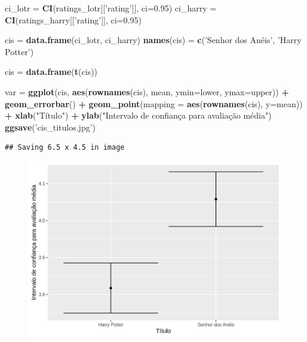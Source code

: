 \documentclass[]{article}
\newenvironment{Shaded}{\begin{snugshade}}{\end{snugshade}}
\newcommand{\KeywordTok}[1]{\textcolor[rgb]{0.13,0.29,0.53}{\textbf{#1}}}
\newcommand{\DataTypeTok}[1]{\textcolor[rgb]{0.13,0.29,0.53}{#1}}
\newcommand{\FloatTok}[1]{\textcolor[rgb]{0.00,0.00,0.81}{#1}}
\newcommand{\StringTok}[1]{\textcolor[rgb]{0.31,0.60,0.02}{#1}}
\newcommand{\OperatorTok}[1]{\textcolor[rgb]{0.81,0.36,0.00}{\textbf{#1}}}
\newcommand{\NormalTok}[1]{#1}
\begin{document}
\begin{Shaded}
\begin{Highlighting}[]
\NormalTok{  ci_lotr =}\StringTok{ }\KeywordTok{CI}\NormalTok{(ratings_lotr[[}\StringTok{'rating'}\NormalTok{]], }\DataTypeTok{ci=}\FloatTok{0.95}\NormalTok{)}
\NormalTok{  ci_harry =}\StringTok{ }\KeywordTok{CI}\NormalTok{(ratings_harry[[}\StringTok{'rating'}\NormalTok{]], }\DataTypeTok{ci=}\FloatTok{0.95}\NormalTok{)}
  
\NormalTok{  cis =}\StringTok{ }\KeywordTok{data.frame}\NormalTok{(ci_lotr, ci_harry)}
  \KeywordTok{names}\NormalTok{(cis) =}\StringTok{ }\KeywordTok{c}\NormalTok{(}\StringTok{'Senhor dos Anéis'}\NormalTok{, }\StringTok{'Harry Potter'}\NormalTok{)}
  
\NormalTok{  cis =}\StringTok{ }\KeywordTok{data.frame}\NormalTok{(}\KeywordTok{t}\NormalTok{(cis))}
  
\NormalTok{  var =}\StringTok{ }\KeywordTok{ggplot}\NormalTok{(cis, }\KeywordTok{aes}\NormalTok{(}\KeywordTok{rownames}\NormalTok{(cis), mean, }\DataTypeTok{ymin=}\NormalTok{lower, }\DataTypeTok{ymax=}\NormalTok{upper)) }\OperatorTok{+}
\StringTok{    }\KeywordTok{geom_errorbar}\NormalTok{() }\OperatorTok{+}
\StringTok{    }\KeywordTok{geom_point}\NormalTok{(}\DataTypeTok{mapping =} \KeywordTok{aes}\NormalTok{(}\KeywordTok{rownames}\NormalTok{(cis), }\DataTypeTok{y=}\NormalTok{mean)) }\OperatorTok{+}
\StringTok{    }\KeywordTok{xlab}\NormalTok{(}\StringTok{"Título"}\NormalTok{) }\OperatorTok{+}\StringTok{ }\KeywordTok{ylab}\NormalTok{(}\StringTok{"Intervalo de confiança para avaliação média"}\NormalTok{)}
  \KeywordTok{ggsave}\NormalTok{(}\StringTok{'cis_titulos.jpg'}\NormalTok{)}
\end{Highlighting}
\end{Shaded}

\begin{verbatim}
## Saving 6.5 x 4.5 in image
\end{verbatim}

\begin{figure}
\centering
\includegraphics{./cis_titulos.jpg}
\caption{}
\end{figure}
\end{document}
